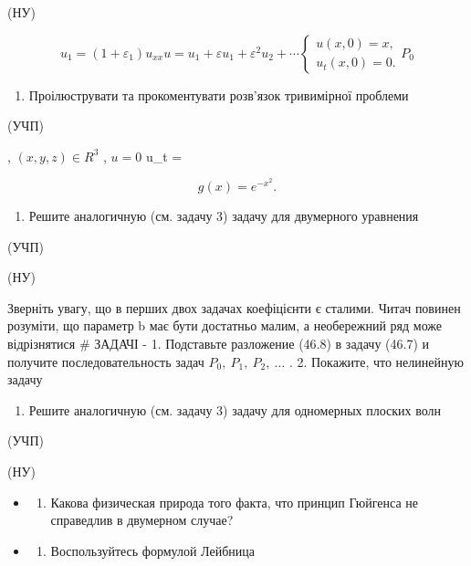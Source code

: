 \documentclass[
  ukrainian,
]{article}
\providecommand{\tightlist}{%
  \setlength{\itemsep}{0pt}\setlength{\parskip}{0pt}}
\begin{document}
(НУ)

\[
u_1 = (1 + \varepsilon_1) u_{xx}
u = u_1 + \varepsilon u_1 + \varepsilon^2 u_2 + \cdots
\begin{cases} u(x, 0) = x, \\ u_t(x, 0) = 0. \end{cases}
P_{0}
\]

\begin{enumerate}
\def\labelenumi{\arabic{enumi}.}
\setcounter{enumi}{2}
\tightlist
\item
  Проілюструвати та прокоментувати розв'язок тривимірної проблеми
\end{enumerate}

(УЧП)

, \((x, y, z) \in R^3\) , \(u = 0\) u\_t =

\[
g(x) = e^{-x^2}.
\]

\begin{enumerate}
\def\labelenumi{\arabic{enumi}.}
\setcounter{enumi}{3}
\tightlist
\item
  Решите аналогичную (см. задачу 3) задачу для двумерного уравнения
\end{enumerate}

(УЧП)

(НУ)

Зверніть увагу, що в перших двох задачах коефіцієнти є сталими. Читач
повинен розуміти, що параметр b має бути достатньо малим, а необережний
ряд може відрізнятися \# ЗАДАЧІ - 1. Подставьте разложение (46.8) в
задачу (46.7) и получите последовательность задач
\(P_0,\ P_1,\ P_2,\ \dots\) . 2. Покажите, что нелинейную задачу

\begin{enumerate}
\def\labelenumi{\arabic{enumi}.}
\setcounter{enumi}{4}
\tightlist
\item
  Решите аналогичную (см. задачу 3) задачу для одномерных плоских волн
\end{enumerate}

(УЧП)

(НУ)

\begin{itemize}
\tightlist
\item
  \begin{enumerate}
  \def\labelenumi{\arabic{enumi}.}
  \setcounter{enumi}{5}
  \tightlist
  \item
    Какова физическая природа того факта, что принцип Гюйгенса не
    справедлив в двумерном случае?
  \end{enumerate}
\item
  \begin{enumerate}
  \def\labelenumi{\arabic{enumi}.}
  \setcounter{enumi}{6}
  \tightlist
  \item
    Воспользуйтесь формулой Лейбница
  \end{enumerate}
\end{itemize}
\end{document}
